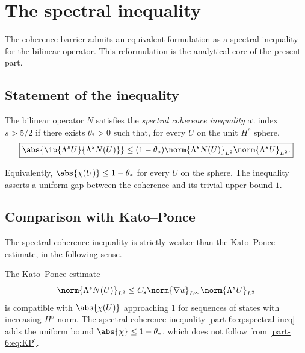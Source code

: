 \section{The spectral inequality}
\label{part-6:sec:spectral-inequality}

The coherence barrier admits an equivalent formulation as a spectral 
inequality for the bilinear operator. This reformulation is the 
analytical core of the present part.

\subsection{Statement of the inequality}
\label{part-6:ssec:spectral-ineq-statement}

\begin{definition}\label{part-6:def:spectral-ineq}
The bilinear operator $N$ satisfies the \emph{spectral coherence 
inequality} at index $s>5/2$ if there exists $\theta_\ast>0$ such 
that, for every $U$ on the unit $H^s$ sphere,
\begin{equation}\label{part-6:eq:spectral-ineq}
\boxed{
\abs{\ip{\Lambda^s U}{\Lambda^s N(U)}} 
\leq (1-\theta_\ast)\norm{\Lambda^s N(U)}_{L^2}
\norm{\Lambda^s U}_{L^2}.
}
\end{equation}
\end{definition}

Equivalently, $\abs{\chi(U)}\leq 1-\theta_\ast$ for every $U$ on 
the sphere. The inequality asserts a uniform gap between the 
coherence and its trivial upper bound $1$.

\subsection{Comparison with Kato--Ponce}
\label{part-6:ssec:KP-comparison}

The spectral coherence inequality is strictly weaker than the 
Kato--Ponce estimate, in the following sense.

\begin{proposition}\label{part-6:prop:KP-relation}
The Kato--Ponce estimate
\begin{equation}\label{part-6:eq:KP}
\norm{\Lambda^s N(U)}_{L^2} \leq C_s\norm{\nabla u}_{L^\infty}
\norm{\Lambda^s U}_{L^2}
\end{equation}
is compatible with $\abs{\chi(U)}$ approaching $1$ for sequences 
of states with increasing $H^s$ norm. The spectral coherence 
inequality \eqref{part-6:eq:spectral-ineq} adds the uniform bound 
$\abs{\chi}\leq 1-\theta_\ast$, which does not follow from 
\eqref{part-6:eq:KP}.
\end{proposition}


